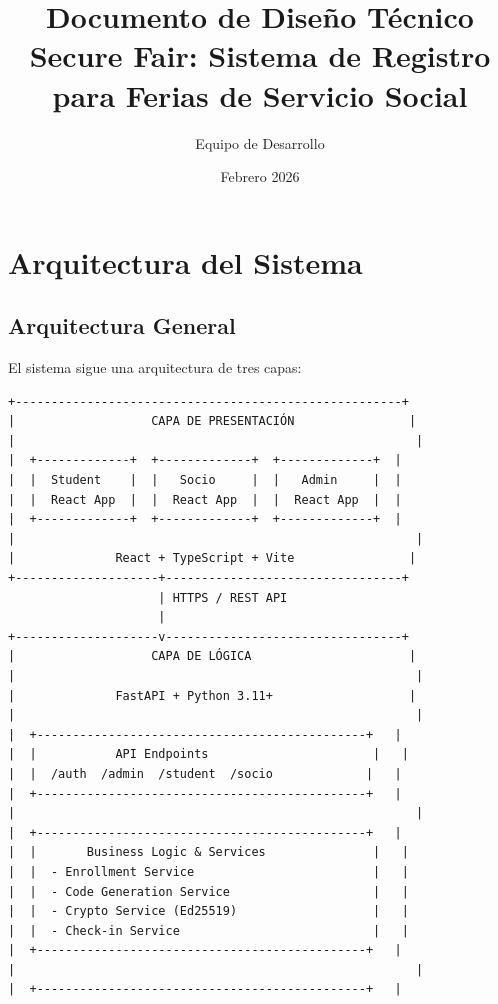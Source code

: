 \documentclass[12pt,a4paper]{article}
\title{\textbf{Documento de Diseño Técnico}\\
\large Secure Fair: Sistema de Registro para Ferias de Servicio Social}
\author{Equipo de Desarrollo}
\date{Febrero 2026}
\begin{document}
\maketitle
\newpage

\tableofcontents
\newpage

\section{Arquitectura del Sistema}

\subsection{Arquitectura General}

El sistema sigue una arquitectura de tres capas:

\begin{verbatim}
+------------------------------------------------------+
|                   CAPA DE PRESENTACIÓN                |
|                                                        |
|  +-------------+  +-------------+  +-------------+  |
|  |  Student    |  |   Socio     |  |   Admin     |  |
|  |  React App  |  |  React App  |  |  React App  |  |
|  +-------------+  +-------------+  +-------------+  |
|                                                        |
|              React + TypeScript + Vite                |
+--------------------+---------------------------------+
                     | HTTPS / REST API
                     |
+--------------------v---------------------------------+
|                   CAPA DE LÓGICA                      |
|                                                        |
|              FastAPI + Python 3.11+                   |
|                                                        |
|  +----------------------------------------------+   |
|  |           API Endpoints                       |   |
|  |  /auth  /admin  /student  /socio             |   |
|  +----------------------------------------------+   |
|                                                        |
|  +----------------------------------------------+   |
|  |       Business Logic & Services               |   |
|  |  - Enrollment Service                         |   |
|  |  - Code Generation Service                    |   |
|  |  - Crypto Service (Ed25519)                   |   |
|  |  - Check-in Service                           |   |
|  +----------------------------------------------+   |
|                                                        |
|  +----------------------------------------------+   |

\end{verbatim}
\end{document}
